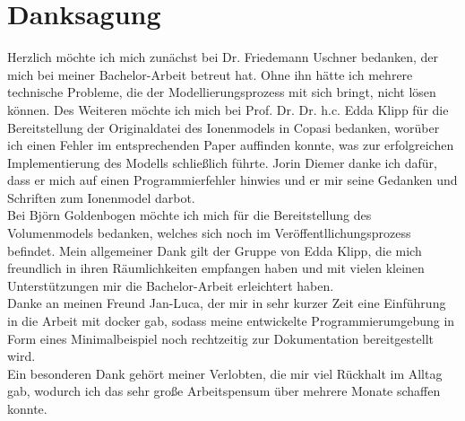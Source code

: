 \section{Danksagung}
Herzlich möchte ich mich zunächst bei Dr. Friedemann Uschner bedanken, der mich bei meiner Bachelor-Arbeit betreut hat. Ohne ihn hätte ich mehrere technische Probleme, die der Modellierungsprozess mit sich bringt, nicht lösen können. Des Weiteren möchte ich mich bei Prof. Dr. Dr. h.c. Edda Klipp für die Bereitstellung der Originaldatei des Ionenmodels in Copasi bedanken, worüber ich einen Fehler im entsprechenden Paper auffinden konnte, was zur erfolgreichen Implementierung des Modells schließlich führte. Jorin Diemer danke ich dafür, dass er mich auf einen Programmierfehler hinwies und er mir seine Gedanken und Schriften zum Ionenmodel darbot. \\
Bei Björn Goldenbogen möchte ich mich für die Bereitstellung des Volumenmodels bedanken, welches sich noch im Veröffentllichungsprozess befindet. Mein allgemeiner Dank gilt der Gruppe von Edda Klipp, die mich freundlich in ihren Räumlichkeiten empfangen haben und mit vielen kleinen Unterstützungen mir die Bachelor-Arbeit erleichtert haben.\\
Danke an meinen Freund Jan-Luca, der mir in sehr kurzer Zeit eine Einführung in die Arbeit mit docker gab, sodass meine entwickelte Programmierumgebung in Form eines Minimalbeispiel noch rechtzeitig zur Dokumentation bereitgestellt wird.\\
Ein besonderen Dank gehört meiner Verlobten, die mir viel Rückhalt im Alltag gab, wodurch ich das sehr große Arbeitspensum über mehrere Monate schaffen konnte. 

\newpage